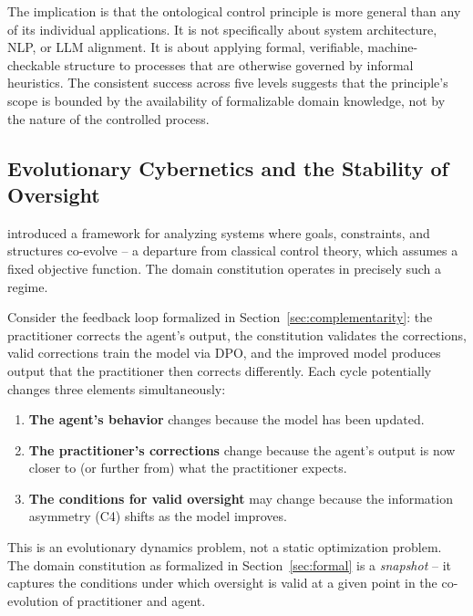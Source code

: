 \documentclass[11pt]{article}
\begin{document}
The implication is that the ontological control principle is more general than any of its individual applications.
It is not specifically about system architecture, NLP, or LLM alignment.
It is about applying formal, verifiable, machine-checkable structure to processes that are otherwise governed by informal heuristics.
The consistent success across five levels suggests that the principle's scope is bounded by the availability of formalizable domain knowledge, not by the nature of the controlled process.

\subsection{Evolutionary Cybernetics and the Stability of Oversight}
\label{sec:disc-evolutionary}

\citet{palagin2025evolutionary} introduced a framework for analyzing systems where goals, constraints, and structures co-evolve -- a departure from classical control theory, which assumes a fixed objective function.
The domain constitution operates in precisely such a regime.

Consider the feedback loop formalized in Section~\ref{sec:complementarity}: the practitioner corrects the agent's output, the constitution validates the corrections, valid corrections train the model via DPO, and the improved model produces output that the practitioner then corrects differently.
Each cycle potentially changes three elements simultaneously:

\begin{enumerate}[nosep]
\item \textbf{The agent's behavior} changes because the model has been updated.
\item \textbf{The practitioner's corrections} change because the agent's output is now closer to (or further from) what the practitioner expects.
\item \textbf{The conditions for valid oversight} may change because the information asymmetry (C4) shifts as the model improves.
\end{enumerate}

This is an evolutionary dynamics problem, not a static optimization problem.
The domain constitution as formalized in Section~\ref{sec:formal} is a \emph{snapshot} -- it captures the conditions under which oversight is valid at a given point in the co-evolution of practitioner and agent.
\end{document}
